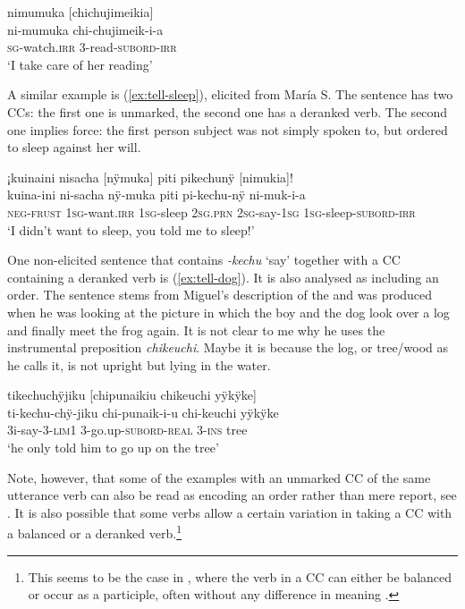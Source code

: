 \ea\label{ex:CC-der-2}
\begingl
\glpreamble nimumuka \textup{[}chichujimeikia\textup{]}\\
\gla ni-mumuka chi-chujimeik-i-a\\
\textsc{sg}-watch.\textsc{irr} 3-read-\textsc{subord}-\textsc{irr}\\
\glft ‘I take care of her reading’
\endgl
\trailingcitation{[mxx-e120415ls.149]}
\xe

A similar example is (\ref{ex:tell-sleep}), elicited from María S. The sentence has two CCs: the first one is unmarked, the second one has a deranked verb. The second one implies force: the first person subject was not simply spoken to, but ordered to sleep against her will.

\ea\label{ex:tell-sleep}
\begingl
\glpreamble ¡kuinaini nisacha \textup{[}nÿmuka\textup{]} piti pikechunÿ \textup{[}nimukia\textup{]}!\\
\gla kuina-ini ni-sacha nÿ-muka piti pi-kechu-nÿ ni-muk-i-a\\
\glb \textsc{neg}-\textsc{frust} 1\textsc{sg}-want.\textsc{irr} 1\textsc{sg}-sleep 2\textsc{sg.prn} 2\textsc{sg}-say-1\textsc{sg} 1\textsc{sg}-sleep-\textsc{subord}-\textsc{irr}\\
\glft ‘I didn’t want to sleep, you told me to sleep!’
\endgl
\trailingcitation{[rxx-e181024l]}
\xe

One non-elicited sentence that contains \textit{-kechu} ‘say’ together with a CC containing a deranked verb is (\ref{ex:tell-dog}). It is also analysed as including an order. The sentence stems from Miguel’s description of the  and was produced when he was looking at the picture in which the boy and the dog look over a log and finally meet the frog again. It is not clear to me why he uses the instrumental preposition \textit{chikeuchi}. Maybe it is because the log, or tree/wood as he calls it, is not upright but lying in the water.

\ea\label{ex:tell-dog}
\begingl
\glpreamble tikechuchÿjiku \textup{[}chipunaikiu chikeuchi yÿkÿke\textup{]}\\
\gla ti-kechu-chÿ-jiku chi-punaik-i-u chi-keuchi yÿkÿke\\
\glb 3i-say-3-\textsc{lim}1 3-go.up-\textsc{subord}-\textsc{real} 3-\textsc{ins} tree\\
\glft ‘he only told him to go up on the tree’
\endgl
\trailingcitation{[mox-a110920l-2.176-179]}
\xe

Note, however, that some of the examples with an unmarked CC of the same utterance verb can also be read as encoding an order rather than mere report, see . It is also possible that some verbs allow a certain variation in taking a CC with a balanced or a deranked verb.\footnote{This seems to be the case in , where the verb in a CC can either be balanced or occur as a participle, often without any difference in meaning \citep[424]{Danielsen2007}.} 

